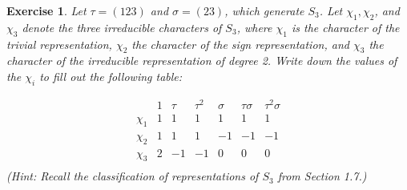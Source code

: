 \documentclass{article}
\newtheorem{exercise}[theorem]{Exercise}
\begin{document}
\begin{exercise}
    Let \(\tau = (123)\) and \(\sigma = (23)\), which generate \( S_3 \). Let \(\chi_1, \chi_2\), and \(\chi_3\) denote the three irreducible characters of \( S_3 \), where \(\chi_1\) is the character of the trivial representation, \(\chi_2\) the character of the sign representation, and \(\chi_3\) the character of the irreducible representation of degree 2. Write down the values of the \(\chi_i\) to fill out the following table:

    \[
    \begin{array}{c|c|c|c|c|c|c}
         & 1 & \tau & \tau^2 & \sigma & \tau\sigma & \tau^2\sigma \\
        \hline
        \chi_1 &1  &1  &1  &1  &1  &1  \\
        \chi_2 &1  &1  &1  &-1  &-1  &-1  \\
        \chi_3 &2  &-1  &-1  &0  &0  & 0 \\
    \end{array}
    \]
    (Hint: Recall the classification of representations of \( S_3 \) from Section 1.7.)
\end{exercise}
\end{document}
